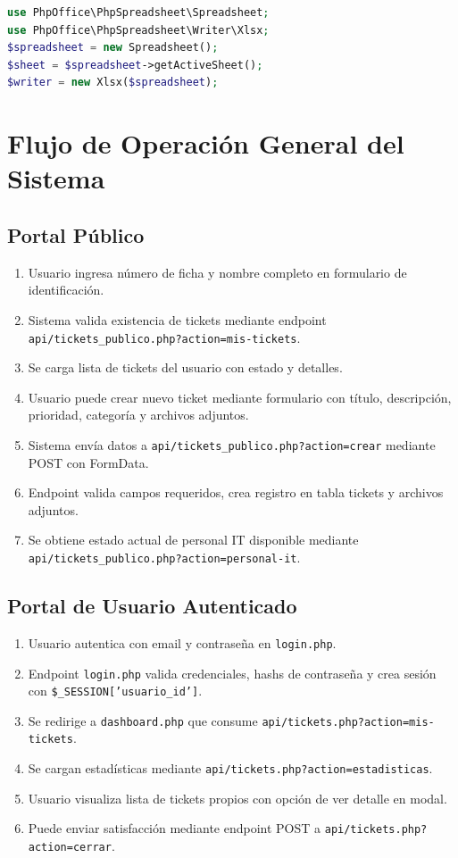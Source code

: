\documentclass[12pt,a4paper]{article}
\begin{document}
\begin{lstlisting}[language=PHP,caption={Uso de PhpSpreadsheet}]
use PhpOffice\PhpSpreadsheet\Spreadsheet;
use PhpOffice\PhpSpreadsheet\Writer\Xlsx;
$spreadsheet = new Spreadsheet();
$sheet = $spreadsheet->getActiveSheet();
$writer = new Xlsx($spreadsheet);
\end{lstlisting}

\newpage

\section{Flujo de Operación General del Sistema}

\subsection{Portal Público}

\begin{enumerate}
    \item Usuario ingresa número de ficha y nombre completo en formulario de identificación.
    \item Sistema valida existencia de tickets mediante endpoint \texttt{api/tickets\_publico.php?action=mis-tickets}.
    \item Se carga lista de tickets del usuario con estado y detalles.
    \item Usuario puede crear nuevo ticket mediante formulario con título, descripción, prioridad, categoría y archivos adjuntos.
    \item Sistema envía datos a \texttt{api/tickets\_publico.php?action=crear} mediante POST con FormData.
    \item Endpoint valida campos requeridos, crea registro en tabla tickets y archivos adjuntos.
    \item Se obtiene estado actual de personal IT disponible mediante \texttt{api/tickets\_publico.php?action=personal-it}.
\end{enumerate}

\subsection{Portal de Usuario Autenticado}

\begin{enumerate}
    \item Usuario autentica con email y contraseña en \texttt{login.php}.
    \item Endpoint \texttt{login.php} valida credenciales, hashs de contraseña y crea sesión con \texttt{\$\_SESSION['usuario\_id']}.
    \item Se redirige a \texttt{dashboard.php} que consume \texttt{api/tickets.php?action=mis-tickets}.
    \item Se cargan estadísticas mediante \texttt{api/tickets.php?action=estadisticas}.
    \item Usuario visualiza lista de tickets propios con opción de ver detalle en modal.
    \item Puede enviar satisfacción mediante endpoint POST a \texttt{api/tickets.php?action=cerrar}.
\end{enumerate}
\end{document}
